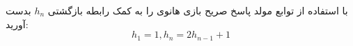 \p
    با استفاده از توابع مولد پاسخ صریح بازی هانوی را به کمک رابطه بازگشتی
    $h_n$
    بدست آورید:
        $$h_1 = 1, h_n = 2h_{n-1} + 1$$
